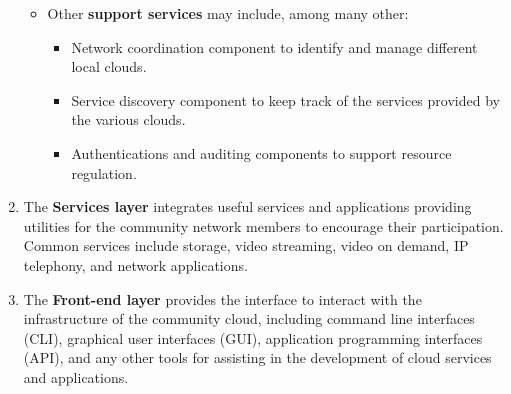\begin{enumerate}
\begin{itemize}
		\item Other \textbf{support services} may include, among many other:
		
		\begin{itemize}
			\item Network coordination component to identify and manage different local clouds.
			\item Service discovery component to keep track of the services provided by the various clouds.
			\item Authentications and auditing components to support resource regulation.
		\end{itemize}

	\end{itemize}

	\item The \textbf{Services layer} integrates useful services and applications providing utilities for the community network members to encourage their participation. 
	Common services include storage, video streaming, video on demand, IP telephony, and network applications.

	\item The \textbf{Front-end layer} provides the interface to interact with the infrastructure of the community cloud, including
		command line interfaces (CLI), 
		graphical user interfaces (GUI), 
		application programming interfaces (API), 
	and any other tools for assisting in the development of cloud services and applications.

\end{enumerate}

%
%
%

